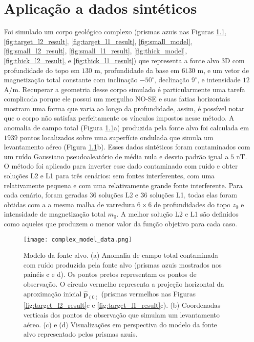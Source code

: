 \chapter{Aplicação a dados sintéticos}

Foi simulado um corpo geológico complexo (prismas azuis nas Figuras 
\ref{fig:target_model}, \ref{fig:target_l2_result}, \ref{fig:target_l1_result},
\ref{fig:small_model}, \ref{fig:small_l2_result}, \ref{fig:small_l1_result}, 
\ref{fig:thick_model}, \ref{fig:thick_l2_result}, e \ref{fig:thick_l1_result})
que representa a fonte alvo 3D com profundidade do topo em $130$ m, profundidade da base em $6130$ m, e um vetor de magnetização total constante com inclinação $-50^{\circ}$, 
declinação $9^{\circ}$, e intensidade $12$ A/m. 
Recuperar a geometria desse corpo simulado é particularmente uma tarefa complicada porque ele possui um mergulho NO-SE e suas fatias horizontais mostram uma forma que varia ao longo da profundidade, assim, é possível notar que o corpo não satisfaz perfeitamente os vínculos impostos nesse método.
A anomalia de campo total (Figura \ref{fig:target_model}a) produzida pela fonte alvo foi calculada em $1939$ pontos localizados sobre uma superfície ondulada que simula um levantamento aéreo (Figura \ref{fig:target_model}b). Esses dados sintéticos foram contaminados com um ruído Gaussiano pseudoaleatório de média nula e desvio padrão igual a $5$ nT.
O método foi aplicado para inverter esse dado contaminado com ruído e obter soluções L2 e L1 para três cenários: sem fontes interferentes, 
com uma relativamente pequena e com uma relativamente grande fonte interferente.
Para cada cenário, foram geradas $36$ soluções L2 e $36$ soluções L1, 
todas elas foram obtidas com a a mesma malha de varredura $6 \times 6$ de profundidades do topo $z_{0}$ e intensidade de magnetização total $m_{0}$.
A melhor solução L2 e L1 são definidos como aqueles que produzem o menor valor da função objetivo para cada caso.

\begin{figure}[!htb]
	\centering
	\texttt{[image: complex\_model\_data.png]}
	\caption{Modelo da fonte alvo. (a) Anomalia de campo total contaminada com ruído produzida pela fonte alvo (prismas azuis mostrados nos painéis c e d). Os pontos pretos representam os pontos de observação. O círculo vermelho representa a projeção horizontal da aproximação inicial $\hat{\mathbf{p}}_{(0)}$ (prismas vermelhos nas Figuras
		\ref{fig:target_l2_result}c e \ref{fig:target_l1_result}c). (b) Coordenadas verticais dos pontos de observação que simulam um levantamento aéreo.
		(c) e (d) Visualizações em perspectiva do modelo da fonte alvo representado pelos prismas azuis.
	}
	\label{fig:target_model}
\end{figure}
\pagebreak

